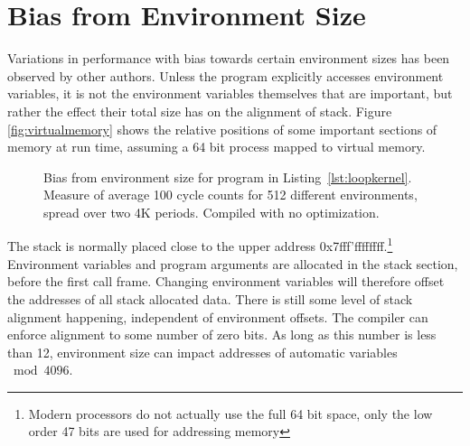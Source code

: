 \documentclass[a4paper,10pt,twocolumn,twoside]{article}
\begin{document}
\section{Bias from Environment Size}
Variations in performance with bias towards certain environment sizes has been observed by other authors.
Unless the program explicitly accesses environment variables, it is not the environment variables themselves that are important, but rather the effect their total size has on the alignment of stack. 
Figure \ref{fig:virtualmemory} shows the relative positions of some important sections of memory at run time, assuming a 64 bit process mapped to virtual memory. 

\begin{figure*}[t]
  \caption{Bias from environment size for program in Listing~\ref{lst:loopkernel}. Measure of average 100 cycle counts for 512 different environments, spread over two 4K periods. Compiled with no optimization.}
  \label{fig:envbias}
\end{figure*}

The stack is normally placed close to the upper address 0x7fff'ffffffff.\footnote{Modern processors do not actually use the full 64 bit space, only the low order 47 bits are used for addressing memory}
Environment variables and program arguments are allocated in the stack section, before the first call frame.
Changing environment variables will therefore offset the addresses of all stack allocated data.
There is still some level of stack alignment happening, independent of environment offsets. 
The compiler can enforce alignment to some number of zero bits.
As long as this number is less than 12, environment size can impact addresses of automatic variables $\bmod 4096$.
\end{document}
